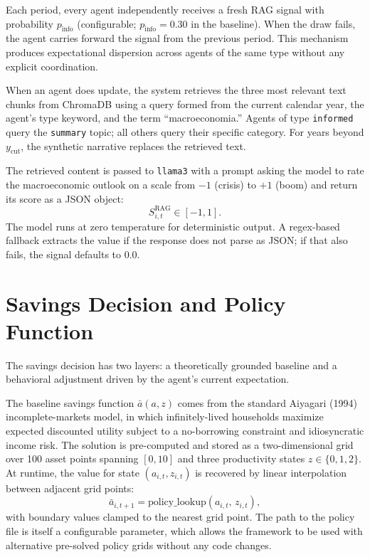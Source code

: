 Each period, every agent independently receives a fresh RAG signal with probability $p_{\text{info}}$ (configurable; $p_{\text{info}} = 0.30$ in the baseline). When the draw fails, the agent carries forward the signal from the previous period. This mechanism produces expectational dispersion across agents of the same type without any explicit coordination.

When an agent does update, the system retrieves the three most relevant text chunks from ChromaDB using a query formed from the current calendar year, the agent's type keyword, and the term ``macroeconomia.'' Agents of type \texttt{informed} query the \texttt{summary} topic; all others query their specific category. For years beyond $y_{\text{cut}}$, the synthetic narrative replaces the retrieved text.

The retrieved content is passed to \texttt{llama3} with a prompt asking the model to rate the macroeconomic outlook on a scale from $-1$ (crisis) to $+1$ (boom) and return its score as a JSON object:
\begin{equation}
    S^{\text{RAG}}_{i,t} \in [-1, 1].
    \label{eq:rag_signal_range}
\end{equation}
The model runs at zero temperature for deterministic output. A regex-based fallback extracts the value if the response does not parse as JSON; if that also fails, the signal defaults to $0.0$.


\section{Savings Decision and Policy Function}
\label{sec:policy}

The savings decision has two layers: a theoretically grounded baseline and a behavioral adjustment driven by the agent's current expectation.

The baseline savings function $\bar{a}(a, z)$ comes from the standard Aiyagari (1994) incomplete-markets model, in which infinitely-lived households maximize expected discounted utility subject to a no-borrowing constraint and idiosyncratic income risk. The solution is pre-computed and stored as a two-dimensional grid over 100 asset points spanning $[0, 10]$ and three productivity states $z \in \{0, 1, 2\}$. At runtime, the value for state $(a_{i,t}, z_{i,t})$ is recovered by linear interpolation between adjacent grid points:
\begin{equation}
    \bar{a}_{i,t+1} = \text{policy\_lookup}(a_{i,t},\, z_{i,t}),
    \label{eq:policy_lookup}
\end{equation}
with boundary values clamped to the nearest grid point. The path to the policy file is itself a configurable parameter, which allows the framework to be used with alternative pre-solved policy grids without any code changes.

